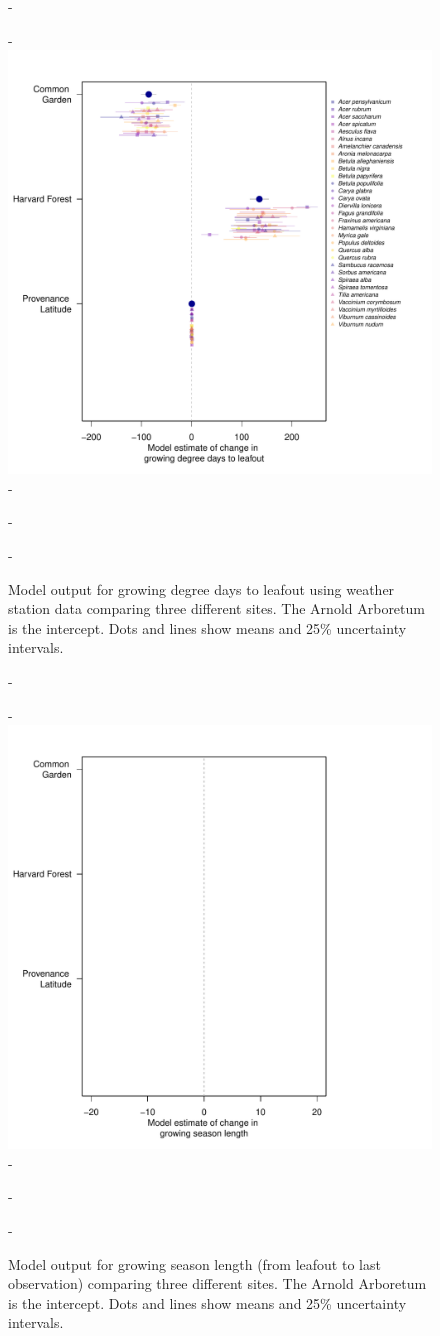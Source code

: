 \documentclass{article}\usepackage[]{graphicx}\usepackage[]{color}
\begin{document}
{{\begin{figure} [H]
  -\begin{center}
  -\includegraphics[width=12cm]{..//analyses/figures/site_prov_all.pdf}
  -\caption{Model output for growing degree days to leafout using weather station data comparing three different sites. The Arnold Arboretum is the intercept. Dots and lines show means and 25\% uncertainty intervals.}\label{fig:allsites}
  -\end{center}
  -\end{figure}}
  
{\begin{figure} [H]
  -\begin{center}
  -\includegraphics[width=12cm]{..//analyses/figures/muplot_gsall.pdf}
  -\caption{Model output for growing season length (from leafout to last observation) comparing three different sites. The Arnold Arboretum is the intercept. Dots and lines show means and 25\% uncertainty intervals.}\label{fig:gssites}
  -\end{center}
  -\end{figure}}
  
}
\end{document}
